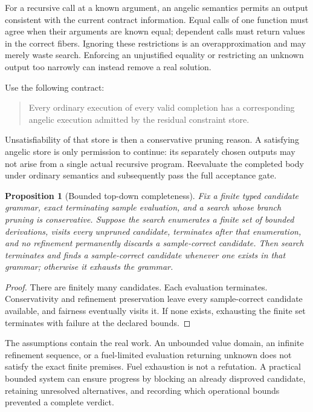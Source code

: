 \documentclass[11pt,a4paper]{article}
\newtheorem{proposition}{Proposition}[section]
\theoremstyle{definition}
\theoremstyle{remark}
\begin{document}
For a recursive call at a known argument, an angelic semantics permits an output
consistent with the current contract information. Equal calls of one function
must agree when their arguments are known equal; dependent calls must return
values in the correct fibers. Ignoring these restrictions is an overapproximation
and may merely waste search. Enforcing an unjustified equality or restricting an
unknown output too narrowly can instead remove a real solution.

Use the following contract:
\begin{quote}
Every ordinary execution of every valid completion has a corresponding angelic
execution admitted by the residual constraint store.
\end{quote}
Unsatisfiability of that store is then a conservative pruning reason. A satisfying
angelic store is only permission to continue: its separately chosen outputs may
not arise from a single actual recursive program. Reevaluate the completed body
under ordinary semantics and subsequently pass the full acceptance gate.

\begin{proposition}[Bounded top-down completeness]\label{prop:bounded}
Fix a finite typed candidate grammar, exact terminating sample evaluation, and
a search whose branch pruning is conservative. Suppose the search enumerates a finite set of bounded derivations,
visits every unpruned candidate, terminates after that enumeration, and no
refinement permanently discards a sample-correct candidate. Then search terminates and finds a sample-correct candidate whenever
one exists in that grammar; otherwise it exhausts the grammar.
\end{proposition}
\begin{proof}
There are finitely many candidates. Each evaluation terminates. Conservativity
and refinement preservation leave every sample-correct candidate available,
and fairness eventually visits it. If none exists, exhausting the finite set
terminates with failure at the declared bounds.
\end{proof}
The assumptions contain the real work. An unbounded value domain, an infinite
refinement sequence, or a fuel-limited evaluation returning unknown does not
satisfy the exact finite premises. Fuel exhaustion is not a refutation. A
practical bounded system can ensure progress by blocking an already disproved
candidate, retaining unresolved alternatives, and recording which operational
bounds prevented a complete verdict.
\end{document}
